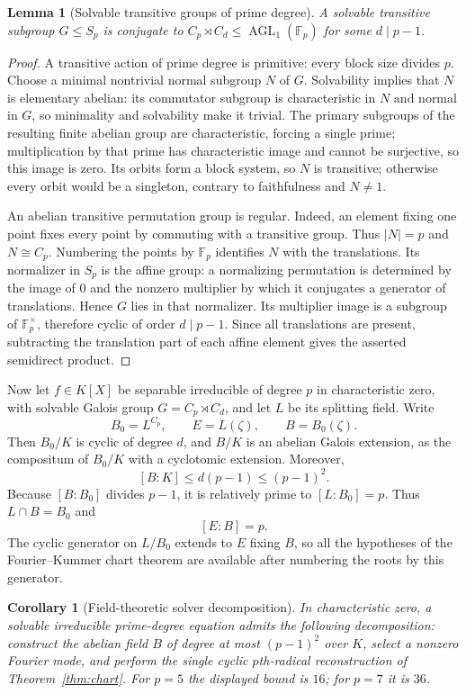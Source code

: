 \documentclass[11pt,a4paper]{article}
\newtheorem{lemma}[theorem]{Lemma}
\newtheorem{corollary}[theorem]{Corollary}
\theoremstyle{definition}
\theoremstyle{remark}
\newcommand{\F}{\mathbb F}
\newcommand{\AGL}{\operatorname{AGL}}
\begin{document}
\begin{lemma}[Solvable transitive groups of prime degree]\label{lem:affine}
A solvable transitive subgroup $G\leq S_p$ is conjugate to
$C_p\rtimes C_d\leq\AGL_1(\F_p)$ for some $d\mid p-1$.
\end{lemma}
\begin{proof}
A transitive action of prime degree is primitive: every block size divides
$p$. Choose a minimal nontrivial normal subgroup $N$ of $G$. Solvability
implies that $N$ is elementary abelian: its commutator subgroup is
characteristic in $N$ and normal in $G$, so minimality and solvability make
it trivial. The primary subgroups of the resulting finite abelian group
are characteristic, forcing a single prime; multiplication by that prime
has characteristic image and cannot be surjective, so this image is zero.
Its orbits form a block system,
so $N$ is transitive; otherwise every orbit would be a singleton, contrary
to faithfulness and $N\neq1$.

An abelian transitive permutation group is regular. Indeed, an element
fixing one point fixes every point by commuting with a transitive group.
Thus $|N|=p$ and $N\cong C_p$. Numbering the points by $\F_p$ identifies
$N$ with the translations. Its normalizer in $S_p$ is the affine group:
a normalizing permutation is determined by the image of $0$ and the
nonzero multiplier by which it conjugates a generator of translations.
Hence $G$ lies in that normalizer. Its multiplier image is a subgroup of
$\F_p^\times$, therefore cyclic of order $d\mid p-1$. Since all
translations are present, subtracting the translation part of each affine
element gives the asserted semidirect product.
\end{proof}

Now let $f\in K[X]$ be separable irreducible of degree $p$ in characteristic
zero, with solvable Galois group $G=C_p\rtimes C_d$, and let $L$ be its
splitting field. Write
\[
 B_0=L^{C_p},\qquad E=L(\zeta),\qquad B=B_0(\zeta).
\]
Then $B_0/K$ is cyclic of degree $d$, and $B/K$ is an abelian Galois
extension, as the compositum of $B_0/K$ with a cyclotomic extension.
Moreover,
\[
 [B:K]\leq d(p-1)\leq(p-1)^2.
\]
Because $[B:B_0]$ divides $p-1$, it is relatively prime to
$[L:B_0]=p$. Thus $L\cap B=B_0$ and
\[
 [E:B]=p.
\]
The cyclic generator on $L/B_0$ extends to $E$ fixing $B$, so all the
hypotheses of the Fourier--Kummer chart theorem are available after
numbering the roots by this generator.

\begin{corollary}[Field-theoretic solver decomposition]\label{cor:tower}
In characteristic zero, a solvable irreducible prime-degree equation admits
the following decomposition: construct the abelian field $B$ of degree at
most $(p-1)^2$ over $K$, select a nonzero Fourier mode, and perform the
single cyclic $p$th-radical reconstruction of Theorem~\ref{thm:chart}.
For $p=5$ the displayed bound is $16$; for $p=7$ it is $36$.
\end{corollary}
\end{document}
